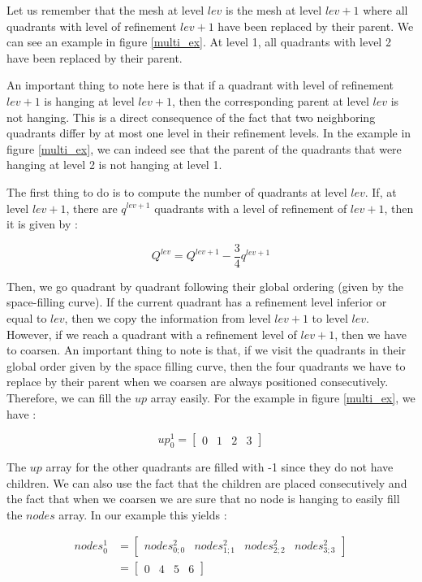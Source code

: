 Let us remember that the mesh at level $lev$ is the mesh at level $lev+1$ where all quadrants with level of refinement $lev+1$ have been replaced by their parent. We can see an example in figure \ref{multi_ex}. At level 1, all quadrants with level 2 have been replaced by their parent.

An important thing to note here is that if a quadrant with level of refinement $lev+1$ is hanging at level $lev+1$, then the corresponding parent at level $lev$ is not hanging. This is a direct consequence of the fact that two neighboring quadrants differ by at most one level in their refinement levels. In the example in figure \ref{multi_ex}, we can indeed see that the parent of the quadrants that were hanging at level 2 is not hanging at level 1.

The first thing to do is to compute the number of quadrants at level $lev$. If, at level $lev+1$, there are $q^{lev+1}$ quadrants with a level of refinement of $lev+1$, then it is given by : 

$$Q^{lev} = Q^{lev+1} - \frac{3}{4} q^{lev+1}$$

Then, we go quadrant by quadrant following their global ordering (given by the space-filling curve). If the current quadrant has a refinement level inferior or equal to $lev$, then we copy the information from level $lev+1$ to level $lev$. However, if we reach a quadrant with a refinement level of $lev+1$, then we have to coarsen. An important thing to note is that, if we visit the quadrants in their global order given by the space filling curve, then the four quadrants we have to replace by their parent when we coarsen are always positioned consecutively. Therefore, we can fill the $up$ array easily. For the example in figure \ref{multi_ex}, we have :

$$up^1_0 = \begin{bmatrix}
0 & 1 & 2 & 3
\end{bmatrix}$$

The $up$ array for the other quadrants are filled with -1 since they do not have children. We can also use the fact that the children are placed consecutively and the fact that when we coarsen we are sure that no node is hanging to easily fill the $nodes$ array. In our example this yields : 

\begin{align*}
nodes^1_0 &= \begin{bmatrix}
nodes^2_{0;0} & nodes^2_{1;1} & nodes^2_{2;2} & nodes^2_{3;3}
\end{bmatrix}\\
&= \begin{bmatrix}
0 & 4 & 5 & 6
\end{bmatrix}
\end{align*}


